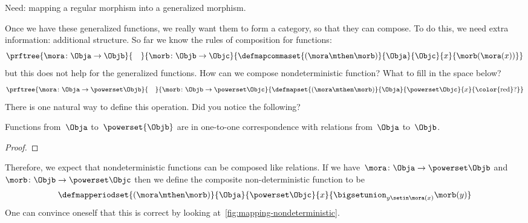 Need: mapping a regular morphism into a generalized morphism.

Once we have these generalized functions, we really want them to form a category, so that they can compose.
To do this, we need extra information: additional structure.
So far we know the rules of composition for functions:
%
\begin{equation}
    \label{eq:monad-function-composition}
    \prftree{\mora\colon \Obja \to \Objb}{\quad}{\morb\colon \Objb \to \Objc}
    {
        \defmapcommaset{
            (\mora\mthen\morb)
        }{
            \Obja
        }{
            \Objc
        }{
            x
        }{
            \morb(\mora(x))
        }
    }
\end{equation}
%
but this does not help for the generalized functions.
How can we compose nondeterministic function?
What to fill in the space below?
%
\begin{equation}
    \label{eq:monad-gen-function-composition}
    \prftree{\mora\colon \Obja \to \powerset\Objb}{\quad}{\morb\colon \Objb \to \powerset \Objc}
    {
        \defmapset{(\mora\mthen\morb)}{\Obja}{\powerset\Objc}%
        {x}{\text{\color{red}?}}}
\end{equation}
%
There is one natural way to define this operation.
Did you notice the following?

\begin{lemma}
    \label{lem:powersets-relations}
    Functions from~$\Obja$ to~$\powerset{\Objb}$ are in one-to-one correspondence with relations from~$\Obja$ to~$\Objb$.
\end{lemma}

\begin{proof}
\end{proof}

Therefore, we expect that nondeterministic functions can be composed like relations.
If we have~$\mora\colon \Obja \to \powerset\Objb$ and~$\morb\colon \Objb \to \powerset \Objc$ then we define the composite non-deterministic function to be
%
\begin{equation}
    \label{eq:fish-nondet}
    \defmapperiodset{(\mora\mthen\morb)}{\Obja}{\powerset\Objc}%
    {x}{ \displaystyle \bigsetunion_{y\setin \mora(x)}\morb(y)}
\end{equation}
%
One can convince oneself that this is correct by looking at~\cref{fig:mapping-nondeterministic}.

